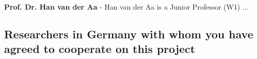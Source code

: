 \textbf{Prof. Dr. Han van der Aa} - Han van der Aa is a Junior Professor (W1) ...


\subsection{Researchers in Germany with whom you have agreed to cooperate on this project}
\label{sec:collab:germany}

%
%
%

